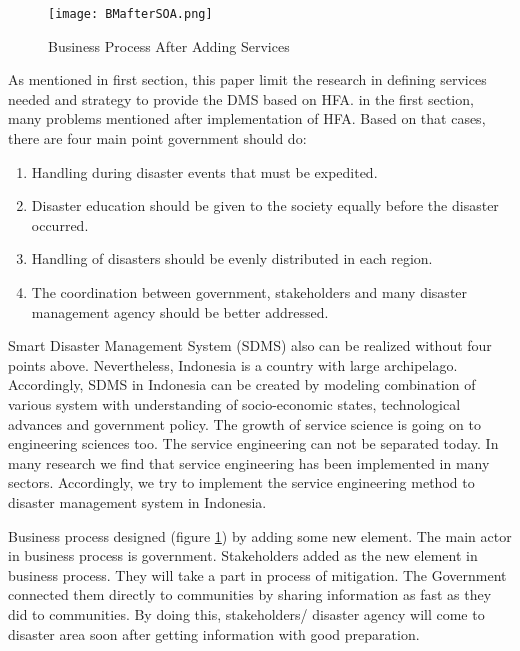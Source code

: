 \begin{figure}[H]
\begin{center}
\texttt{[image: BMafterSOA.png]}
\caption{Business Process After Adding Services}
\label{fig:BisnisMOdelSOA}
\end{center}
\end{figure}
\par

As mentioned in  first section, this paper limit the research  in defining services needed and strategy to provide the DMS based on HFA. in the first section, many problems mentioned after implementation of HFA. Based on that cases, there are four main point government should do:\par

\begin{enumerate}
\setlength{\itemsep}{1.5pt}
\setlength{\parskip}{1.5pt}
\item Handling during disaster events that must be expedited.
\item Disaster education should be given to the society equally before the disaster occurred.
\item Handling of disasters should be evenly distributed in each region.
\item The coordination between government, stakeholders and many disaster management agency should be better addressed.
\end{enumerate}\par

Smart Disaster Management System (SDMS) also can be realized without four points above. Nevertheless, Indonesia is a country with large archipelago. Accordingly, SDMS in Indonesia can be created by modeling combination of various system with understanding of socio-economic states, technological advances and government policy. The growth of service science is going on to engineering sciences too. The service engineering can not be separated today. In many research we find that service engineering has been implemented in many sectors. Accordingly, we try to implement the service engineering method to disaster management system in Indonesia.\par

Business process designed (figure \ref{fig:BisnisMOdelSOA}) by adding some new element. The main actor in business process is government. Stakeholders added as the new element in business process. They will take a part in process of mitigation. The Government connected them directly to communities by sharing information as fast as they did to communities. By doing this, stakeholders/ disaster agency will come to disaster area soon after getting information with good preparation.\par

